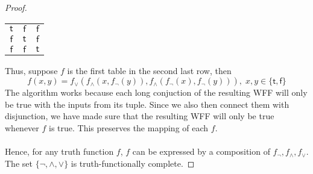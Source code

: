 \documentclass[12pt]{article}
\begin{document}
\begin{proof}
\begin{center}
\begin{tabular}{cc|c}
            $\mathsf{t}$ & $\mathsf{f}$ & $\mathsf{f}$ \\
            $\mathsf{f}$ & $\mathsf{t}$ & $\mathsf{f}$ \\
            $\mathsf{f}$ & $\mathsf{f}$ & $\mathsf{t}$ \\
        \end{tabular}
    \end{center}
$$$$
Thus, suppose $f$ is the first table in the second last row, then 
$$f(x,y) = f_{\lor}(f_{\land}(x,f_{\neg}(y)),f_{\land}(f_{\neg}(x),f_{\neg}(y))), \; x, y \in \{\mathsf{t}, \mathsf{f}\}$$
The algorithm works because each long conjuction of the resulting WFF will only be true with the inputs from its tuple.
Since we also then connect them with disjunction, we have made sure that the resulting WFF will only be true whenever $f$ is true.
This preserves the mapping of each $f$.\\
\\
Hence, for any truth function $f$, $f$ can be expressed by a composition of $f_{\neg}, f_{\land}, f_{\lor}$.
The set $\{\neg, \land, \lor\}$ is truth-functionally complete.

\end{proof}
\end{document}
